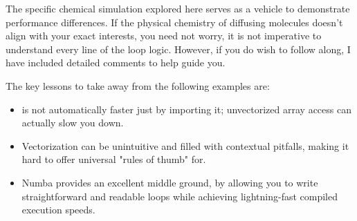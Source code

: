\begin{note}
The specific chemical simulation explored here serves as a vehicle to demonstrate performance differences. If the physical chemistry of diffusing molecules doesn't align with your exact interests, you need not worry, it is not imperative to understand every line of the loop logic. However, if you do wish to follow along, I have included detailed comments to help guide you. 

The key lessons to take away from the following examples are:

\begin{itemize}
    \item {} is not automatically faster just by importing it; unvectorized array access can actually slow you down.
    \item Vectorization can be unintuitive and filled with contextual pitfalls, making it hard to offer universal "rules of thumb" for.
    \item Numba provides an excellent middle ground, by allowing you to write straightforward and readable loops while achieving lightning-fast compiled execution speeds.
\end{itemize}
\end{note}

